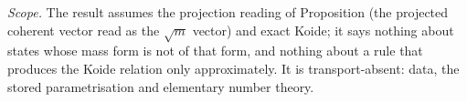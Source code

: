 \emph{Scope.} The result assumes the projection reading of Proposition  (the projected coherent vector read as the $\sqrt{m}$ vector) and exact Koide; it says nothing about states whose mass form is not of that form, and nothing about a rule that produces the Koide relation only approximately. It is transport-absent: data, the stored parametrisation and elementary number theory.
